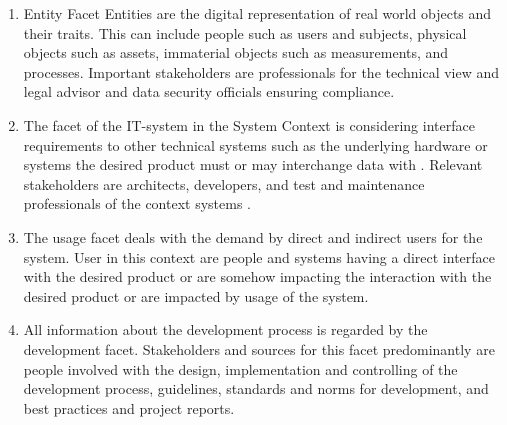 \begin{enumerate}
    \item{Entity Facet} 
    Entities are the digital representation of real world objects and their traits. This can include people such as users and subjects, physical objects such as assets, immaterial objects such as measurements, and processes. Important stakeholders are  professionals for the technical view and legal advisor and data security officials ensuring compliance. \parencite[cf.][70-71]{Pohl.2007}
    \item The facet of the IT-system in the System Context is considering interface requirements to other technical systems such as the underlying hardware or systems the desired product must or may interchange data with \parencite[cf.][192]{Kotonya.2000}. Relevant stakeholders are architects, developers, and test and maintenance professionals of the context systems \parencite[cf.][72]{Pohl.2007}.
    \item The usage facet deals with the demand by direct and indirect users for the system. User in this context are people and systems having a direct interface with the desired product or are somehow impacting the interaction with the desired product or are impacted by usage of the system. \parencite[cf.][75-77]{Pohl.2007}
    \item All information about the development process is regarded by the development facet. Stakeholders and sources for this facet predominantly are people involved with the design, implementation and controlling of the development process, guidelines, standards and norms for development, and best practices and project reports. \parencite[cf.][79]{Pohl.2007}
\end{enumerate}

